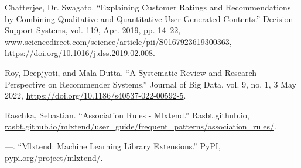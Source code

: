 \documentclass[11pt]{article} %
\begin{document}
\begin{thebibliography}{5}
    Chatterjee, Dr. Swagato. “Explaining Customer Ratings and Recommendations by Combining Qualitative and Quantitative User Generated Contents.” Decision Support Systems, vol. 119, Apr. 2019, pp. 14–22, \url{www.sciencedirect.com/science/article/pii/S0167923619300363, https://doi.org/10.1016/j.dss.2019.02.008}.

    Roy, Deepjyoti, and Mala Dutta. “A Systematic Review and Research Perspective on Recommender Systems.” Journal of Big Data, vol. 9, no. 1, 3 May 2022, \url{https://doi.org/10.1186/s40537-022-00592-5}.

    Raschka, Sebastian. “Association Rules - Mlxtend.” Rasbt.github.io, \url{rasbt.github.io/mlxtend/user_guide/frequent_patterns/association_rules/}.

    ---. “Mlxtend: Machine Learning Library Extensions.” PyPI, \url{pypi.org/project/mlxtend/}.

\end{thebibliography}
\end{document}
